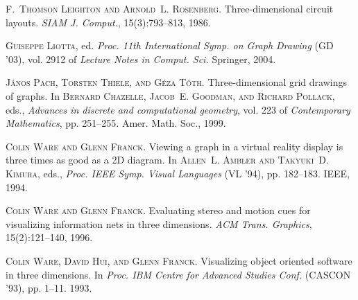 \documentclass[a4paper]{article}
\theoremstyle{plain}
\begin{document}
\begin{thebibliography}{24}
\textsc{F.~Thomson Leighton and Arnold~L. Rosenberg}.
\newblock Three-dimensional circuit layouts.
\newblock \emph{SIAM J. Comput.}, 15(3):793--813, 1986.

\textsc{Guiseppe Liotta}, ed.
\newblock \emph{Proc. 11th International Symp. on Graph Drawing} (GD '03), vol.
  2912 of \emph{Lecture Notes in Comput. Sci.} Springer, 2004.

\textsc{J\'{a}nos Pach, Torsten Thiele, and G\'{e}za T\'{o}th}.
\newblock Three-dimensional grid drawings of graphs.
\newblock In \textsc{Bernard Chazelle, Jacob~E. Goodman, and Richard Pollack},
  eds., \emph{Advances in discrete and computational geometry}, vol. 223 of
  \emph{Contemporary Mathematics}, pp. 251--255. Amer. Math. Soc., 1999.

\textsc{Colin Ware and Glenn Franck}.
\newblock Viewing a graph in a virtual reality display is three times as good
  as a 2{D} diagram.
\newblock In \textsc{Allen~L. Ambler and Takyuki~D. Kimura}, eds., \emph{Proc.
  IEEE Symp. Visual Languages} (VL '94), pp. 182--183. IEEE, 1994.

\textsc{Colin Ware and Glenn Franck}.
\newblock Evaluating stereo and motion cues for visualizing information nets in
  three dimensions.
\newblock \emph{ACM Trans. Graphics}, 15(2):121--140, 1996.

\textsc{Colin Ware, David Hui, and Glenn Franck}.
\newblock Visualizing object oriented software in three dimensions.
\newblock In \emph{Proc. IBM Centre for Advanced Studies Conf.} (CASCON '93),
  pp. 1--11. 1993.

\end{thebibliography}
\end{document}
